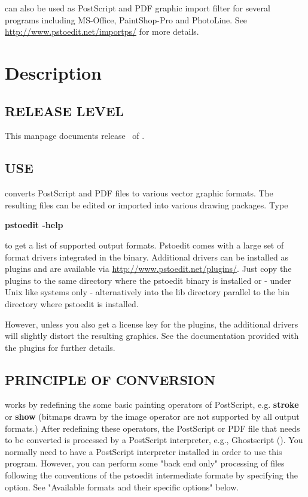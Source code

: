 \documentclass[english,a4paper]{article}
\let\URL\url \let\Email\url \let\File\url
\begin{document}
 can also be used as PostScript and PDF graphic import filter for several programs including
MS-Office,  PaintShop-Pro and PhotoLine. See 
\URL{http://www.pstoedit.net/importps/} for more 
details.

 
\section{Description}

\subsection{RELEASE LEVEL}

This manpage documents release \Version\ of . 

\subsection{USE}

 converts PostScript and PDF files to various vector graphic
formats. The resulting files can be edited or imported into various drawing
packages. Type 

     \textbf{pstoedit -help} 
     
\noindent to get a list of supported output formats. Pstoedit comes with a
large set of format drivers integrated in the binary. Additional drivers can be
installed as plugins and are available via 
\URL{http://www.pstoedit.net/plugins/}. 
Just copy the plugins to the same directory where the pstoedit binary is installed or - under Unix like systems only - alternatively into the lib directory parallel to the bin directory where pstoedit is installed.

However, unless you also get a license key for the plugins, the additional
drivers will slightly distort the resulting graphics. See the documentation
provided with the plugins for further details.

\subsection{PRINCIPLE OF CONVERSION}

 works by redefining the some basic painting operators of
PostScript, e.g. \textbf{stroke} or \textbf{show} (bitmaps drawn by the image
operator are not supported by all output formats.) After
redefining these operators, the PostScript or PDF file that needs to be
converted is processed by a PostScript interpreter, e.g., Ghostscript
(). You normally need to have a PostScript interpreter installed in
order to use this program. However, you can perform some "back end only" processing
of files following the conventions of the pstoedit intermediate formate by specifying the  option. See "Available formats and their specific options" below. 
\end{document}
